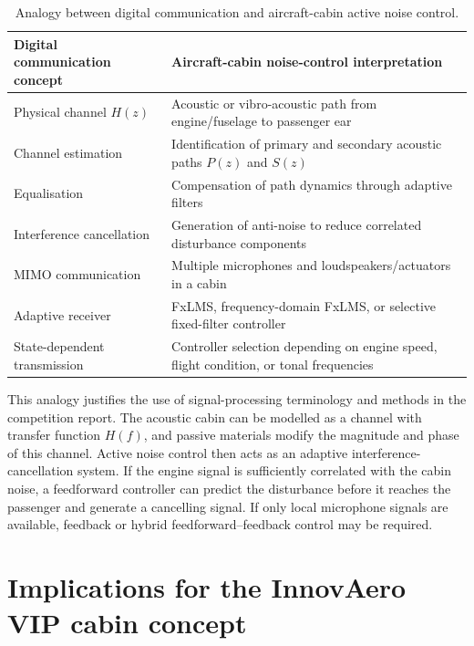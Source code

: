 \begin{table}[h]
    \centering
    \caption{Analogy between digital communication and aircraft-cabin active noise control.}
    \label{tab:communication-anc-analogy}
    \begin{tabularx}{\textwidth}{p{}X}
        \toprule
        \textbf{Digital communication concept} & \textbf{Aircraft-cabin noise-control interpretation} \\
        \midrule
        Physical channel $H(z)$ & Acoustic or vibro-acoustic path from engine/fuselage to passenger ear \\
        Channel estimation & Identification of primary and secondary acoustic paths $P(z)$ and $S(z)$ \\
        Equalisation & Compensation of path dynamics through adaptive filters \\
        Interference cancellation & Generation of anti-noise to reduce correlated disturbance components \\
        MIMO communication & Multiple microphones and loudspeakers/actuators in a cabin \\
        Adaptive receiver & FxLMS, frequency-domain FxLMS, or selective fixed-filter controller \\
        State-dependent transmission & Controller selection depending on engine speed, flight condition, or tonal frequencies \\
        \bottomrule
    \end{tabularx}
\end{table}

This analogy justifies the use of signal-processing terminology and methods in the competition report. The acoustic cabin can be modelled as a channel with transfer function $H(f)$, and passive materials modify the magnitude and phase of this channel. Active noise control then acts as an adaptive interference-cancellation system. If the engine signal is sufficiently correlated with the cabin noise, a feedforward controller can predict the disturbance before it reaches the passenger and generate a cancelling signal. If only local microphone signals are available, feedback or hybrid feedforward--feedback control may be required.

\section{Implications for the InnovAero VIP cabin concept}
\label{sec:implications}


